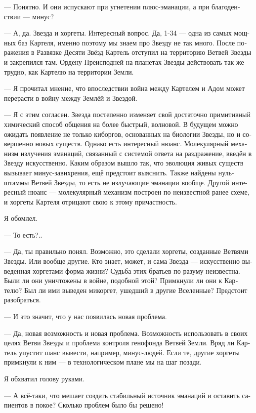 \documentclass[a4paper,12pt,fleqn]{book}\usepackage{cooltooltips}\usepackage{polyglossia}\setdefaultlanguage[babelshorthands=true]{russian}\setotherlanguage{english}\defaultfontfeatures{Ligatures=TeX,Mapping=tex-text} \usepackage{xcolor}\definecolor{lightgray}{HTML}{bbbbbb}\color{lightgray}\newcommand{\ml}[3]{\textenglish{\textcolor{black}{#3}}}
\begin{document}
{--- Понятно.
И они испускают при угнетении плюс-эманации, а при благоденствии --- минус?

--- А, да.
Звезда и хоргеты.
Интересный вопрос.
Да, 1-34 --- одна из самых мощных баз Картеля, именно поэтому мы знаем про Звезду не так много.
После поражения в Развязке Десяти Звёзд Картель отступил на территорию Ветвей Звезды и закрепился там.
Ордену Преисподней на планетах Звезды действовать так же трудно, как Картелю на территории Земли.

--- Я прочитал мнение, что впоследствии война между Картелем и Адом может перерасти в войну между Землёй и Звездой.

--- Я с этим согласен.
Звезда постепенно изменяет свой достаточно примитивный химический способ общения на более быстрый, волновой.
В будущем можно ожидать появление не только киборгов, основанных на биологии Звезды, но и совершенно новых существ.
Однако есть интересный нюанс.
Молекулярный механизм излучения эманаций, связанный с системой ответа на раздражение, введён в Звезду искусственно.
Каким образом вышло так, что эволюция живых существ вызывает минус-завихрения, ещё предстоит выяснить.
Также найдены нуль-штаммы Ветвей Звезды, то есть не излучающие эманации вообще.
Другой интересный нюанс --- молекулярный механизм построен по неизвестной ранее схеме, и хоргеты Картеля отрицают свою к этому причастность.

Я обомлел.

--- То есть?..

--- Да, ты правильно понял.
Возможно, это сделали хоргеты, созданные Ветвями Звезды.
Или вообще другие.
Кто знает, может, и сама Звезда --- искусственно выведенная хоргетами форма жизни?
Судьба этих братьев по разуму неизвестна.
Были ли они уничтожены в войне, подобной этой?
Примкнули ли они к Картелю?
Был ли ими выведен микоргет, ушедший в другие Вселенные?
Предстоит разобраться.

--- И это значит, что у нас появилась новая проблема.

--- Да, новая возможность и новая проблема.
Возможность использовать в своих целях Ветви Звезды и проблема контроля генофонда Ветвей Земли.
Вряд ли Картель упустит шанс вывести, например, минус-людей.
Если те, другие хоргеты примкнули к ним --- в технологическом плане мы на шаг позади.

Я обхватил голову руками.

--- А всё-таки, что мешает создать стабильный источник эманаций и оставить сапиентов в покое?
Сколько проблем было бы решено!

}
\end{document}
